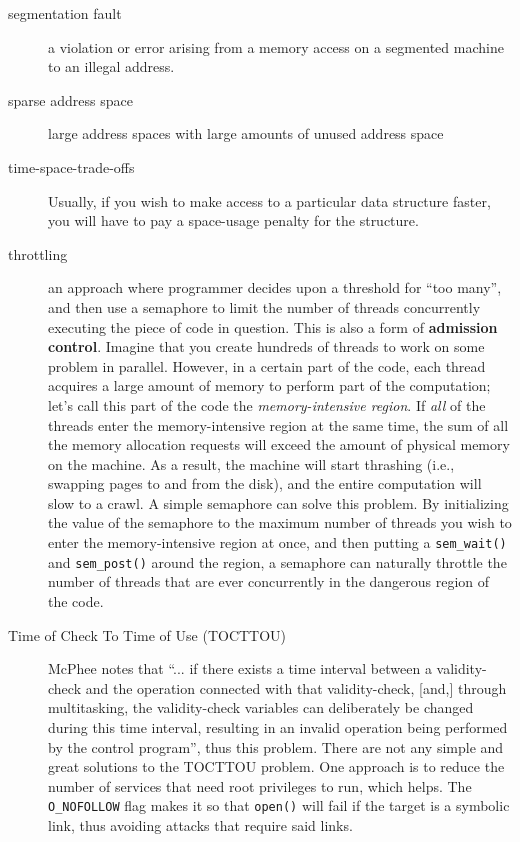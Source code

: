 \begin{description}
\item[segmentation fault] a violation or error arising from a memory access on a segmented machine to an illegal address.

\item[sparse address space] large address spaces with large amounts of unused address space

\item[time-space-trade-offs] Usually, if you wish to make access to a particular data structure faster, you will have to pay a space-usage penalty for the structure.

\item[throttling] an approach where programmer decides upon a threshold for ``too many'', and then use a semaphore to limit the number of threads concurrently executing the piece of code in question.  This is also a form of \textbf{admission control}. Imagine that you create hundreds of threads to work on some problem in parallel. However, in a certain part of the code, each thread acquires a large amount of memory to perform part of the computation; let’s call this part of the code the \emph{memory-intensive region}. If \emph{all} of the threads enter the memory-intensive region at the same time, the sum of all the memory allocation requests will exceed the amount of physical memory on the machine. As a result, the machine will start thrashing (i.e., swapping pages to and from the disk), and the entire computation will slow to a crawl.  A simple semaphore can solve this problem. By initializing the value of the semaphore to the maximum number of threads you wish to enter the memory-intensive region at once, and then putting a \texttt{sem\_wait()} and \texttt{sem\_post()} around the region, a semaphore can naturally throttle the number of threads that are ever concurrently in the dangerous region of the code.

\item[Time of Check To Time of Use (TOCTTOU)] McPhee notes that ``... if there exists a time interval between a validity-check and the operation connected with that validity-check, [and,] through multitasking, the validity-check variables can deliberately be changed during this time interval, resulting in an invalid operation being performed by the control program'', thus this problem.  There are not any simple and great solutions to the TOCTTOU problem. One approach is to reduce the number of services that need root privileges to run, which helps. The \texttt{O\_NOFOLLOW} flag makes it so that \texttt{open()} will fail if the target is a symbolic link, thus avoiding attacks that require said links.


\end{description}
